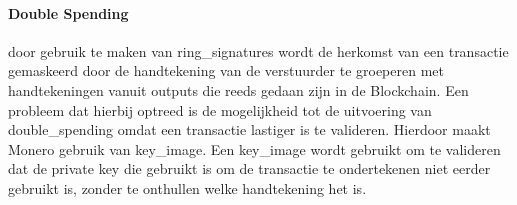 \paragraph{Double Spending} door gebruik te maken van \glspl{ring_signature} wordt de herkomst van een transactie gemaskeerd door de handtekening van de verstuurder te groeperen met handtekeningen vanuit outputs die reeds gedaan zijn in de Blockchain. Een probleem dat hierbij optreed is de mogelijkheid tot de uitvoering van \gls{double_spending} omdat een transactie lastiger is te valideren. Hierdoor maakt Monero gebruik van \gls{key_image}. Een \gls{key_image} wordt gebruikt om te valideren dat de private key die gebruikt is om de transactie te ondertekenen niet eerder gebruikt is, zonder te onthullen welke handtekening het is.
